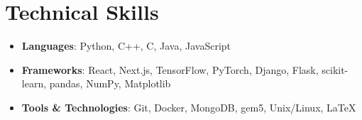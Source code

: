 \documentclass[letterpaper,10pt]{article}
\begin{document}
\section{Technical Skills}
{\normalsize
\begin{itemize}[leftmargin=0.15in, label={}, itemsep=0pt]
  \item \textbf{Languages}: Python, C++, C, Java, JavaScript
  \item \textbf{Frameworks}: React, Next.js, TensorFlow, PyTorch, Django, Flask, scikit-learn, pandas, NumPy, Matplotlib
  \item \textbf{Tools \& Technologies}: Git, Docker, MongoDB, gem5, Unix/Linux, LaTeX
\end{itemize}
}
\end{document}
